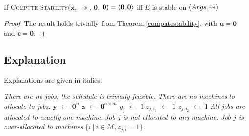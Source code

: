 \begin{corollary}\ \\
	If \textsc{Compute-Stability}$(\mathbf{x}$, $\twoheadrightarrow$, $\mathbf{0}$, $\mathbf{0})=\langle{\mathbf{0}},{\mathbf{0}}\rangle$ iff $E$ is stable on $\langle{Args},{\rightsquigarrow}\rangle$
	
	\begin{proof}
		The result holds trivially from Theorem \ref{computestability}, with $\bar{\mathbf{u}}=\mathbf{0}$ and $\bar{\mathbf{c}}=\mathbf{0}$. 
	\end{proof}
\end{corollary}

\subsection{Explanation}

Explanations are given in italics.

\begin{algorithm}[H]
	\caption{}
	\begin{algorithmic}[1]
					\State \emph{There are no jobs, the schedule is trivially feasible.}
				\Else
					\State \emph{There are no machines to allocate to jobs.}
				\EndIf
			\Else
				\State $\mathbf{y}$ $\gets$ $\mathbf{0}^n$
				\State $\mathbf{z}$ $\gets$ $\mathbf{0}^{n\times m}$
						\State $y_j$ $\gets$ $1$
						\State $z_{j,i_1}$ $\gets$ $1$
						\State $z_{j,i_2}$ $\gets$ $1$
					\EndIf
				\EndFor
					\State \emph{All jobs are allocated to exactly one machine.}
				\Else
							\State \emph{Job $j$ is not allocated to any machine.}
						\EndIf
							\State \emph{Job $j$ is over-allocated to machines $\{i\ |\ i\in\mathcal{M}, z_{j,i}=1\}$.}
						\EndIf
					\EndFor
				\EndIf
			\EndIf
		\EndFunction
	\end{algorithmic}
\end{algorithm}

